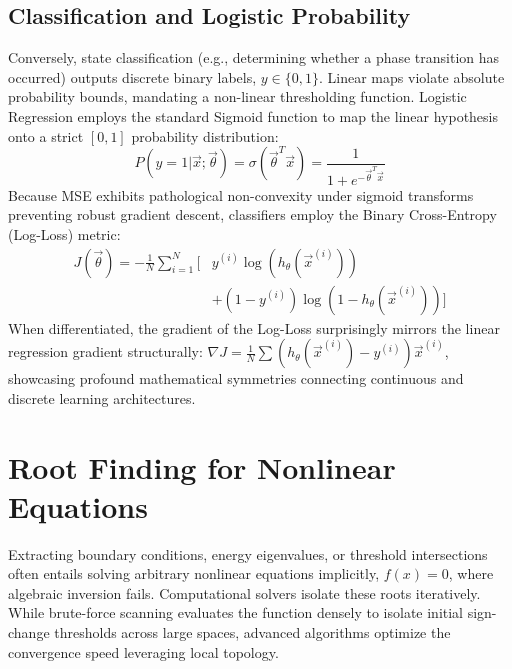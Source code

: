 \documentclass[aps, reprint, twocolumn, superscriptaddress, floatfix]{revtex4-2}
\begin{document}
\subsection{Classification and Logistic Probability}
Conversely, state classification (e.g., determining whether a phase transition has occurred) outputs discrete binary labels, $y \in \{0, 1\}$. Linear maps violate absolute probability bounds, mandating a non-linear thresholding function. Logistic Regression employs the standard Sigmoid function to map the linear hypothesis onto a strict $[0,1]$ probability distribution:
\begin{equation}
    P(y=1 | \vec{x}; \vec{\theta}) = \sigma(\vec{\theta}^T \vec{x}) = \frac{1}{1 + e^{-\vec{\theta}^T \vec{x}}}
\end{equation}
Because MSE exhibits pathological non-convexity under sigmoid transforms preventing robust gradient descent, classifiers employ the Binary Cross-Entropy (Log-Loss) metric:
\begin{equation}
\begin{split}
    J(\vec{\theta}) = - \frac{1}{N} \sum_{i=1}^{N} \Big[ &y^{(i)} \log(h_{\theta}(\vec{x}^{(i)})) \\
    &+ (1 - y^{(i)}) \log(1 - h_{\theta}(\vec{x}^{(i)})) \Big]
\end{split}
\end{equation}
When differentiated, the gradient of the Log-Loss surprisingly mirrors the linear regression gradient structurally: $\nabla J = \frac{1}{N}\sum \left(h_{\theta}(\vec{x}^{(i)}) - y^{(i)}\right) \vec{x}^{(i)}$, showcasing profound mathematical symmetries connecting continuous and discrete learning architectures.

\section{Root Finding for Nonlinear Equations}

Extracting boundary conditions, energy eigenvalues, or threshold intersections often entails solving arbitrary nonlinear equations implicitly, $f(x)=0$, where algebraic inversion fails. Computational solvers isolate these roots iteratively. While brute-force scanning evaluates the function densely to isolate initial sign-change thresholds across large spaces, advanced algorithms optimize the convergence speed leveraging local topology.
\end{document}
